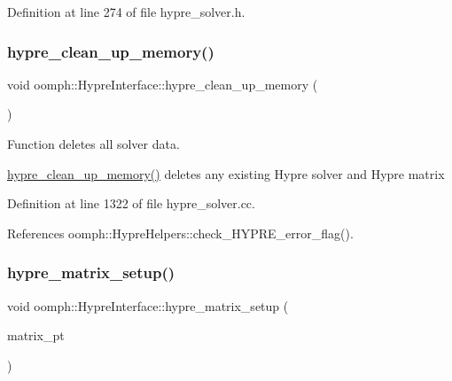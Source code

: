 Definition at line 274 of file hypre\+\_\+solver.\+h.

\mbox{\label{classoomph_1_1HypreInterface_a989fc83bc47f7b4fb8a753b16a26a012}} 
\subsubsection{\texorpdfstring{hypre\+\_\+clean\+\_\+up\+\_\+memory()}{hypre\_clean\_up\_memory()}}
{\footnotesize\ttfamily void oomph\+::\+Hypre\+Interface\+::hypre\+\_\+clean\+\_\+up\+\_\+memory (\begin{DoxyParamCaption}{ }\end{DoxyParamCaption})\hspace{0.3cm}{\ttfamily [protected]}}



Function deletes all solver data. 

\hyperlink{classoomph_1_1HypreInterface_a989fc83bc47f7b4fb8a753b16a26a012}{hypre\+\_\+clean\+\_\+up\+\_\+memory()} deletes any existing Hypre solver and Hypre matrix 

Definition at line 1322 of file hypre\+\_\+solver.\+cc.



References oomph\+::\+Hypre\+Helpers\+::check\+\_\+\+H\+Y\+P\+R\+E\+\_\+error\+\_\+flag().

\mbox{\label{classoomph_1_1HypreInterface_aebc23d169937d5e6a5b492710843ae7b}} 
\subsubsection{\texorpdfstring{hypre\+\_\+matrix\+\_\+setup()}{hypre\_matrix\_setup()}}
{\footnotesize\ttfamily void oomph\+::\+Hypre\+Interface\+::hypre\+\_\+matrix\+\_\+setup (\begin{DoxyParamCaption}\item[{\hyperlink{classoomph_1_1CRDoubleMatrix}{C\+R\+Double\+Matrix} $\ast$}]{matrix\+\_\+pt }\end{DoxyParamCaption})\hspace{0.3cm}{\ttfamily [protected]}}



